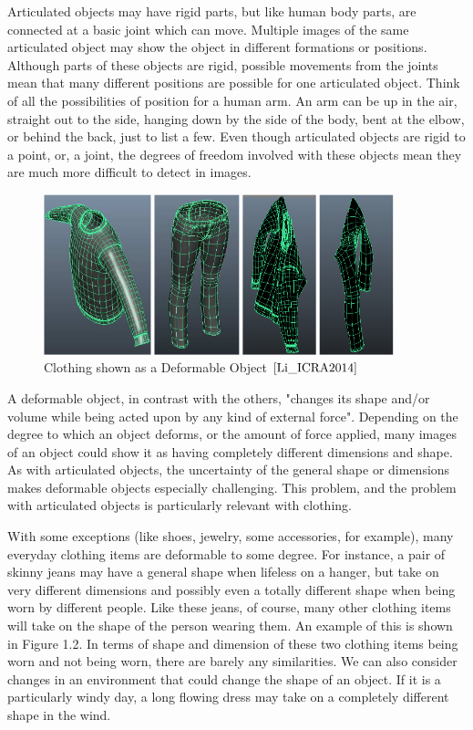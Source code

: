 \documentclass[12pt]{report} %
\begin{document}
	Articulated objects may have rigid parts, but like human body parts, are connected at a basic joint which can move\cite{szeliski2010computer}. Multiple images of the same articulated object may show the object in different formations or positions. Although parts of these objects are rigid, possible movements from the joints mean that many different positions are possible for one articulated object. Think of all the possibilities of position for a human arm. An arm can be up in the air, straight out to the side, hanging down by the side of the body, bent at the elbow, or behind the back, just to list a few. Even though articulated objects are rigid to a point, or, a joint, the degrees of freedom involved with these objects mean they are much more difficult to detect in images.
	
 \begin{figure}
\centering
\includegraphics[width=4in]{deformable} 
\caption{Clothing shown as a Deformable Object $\cite{Li_ICRA2014}$}
\end{figure}

	A deformable object, in contrast with the others, "changes its shape and/or volume while being acted upon by any kind of external force"\cite{wolfram}. Depending on the degree to which an object deforms, or the amount of force applied, many images of an object could show it as having completely different dimensions and shape. As with articulated objects, the uncertainty of the general shape or dimensions makes deformable objects especially challenging. This problem, and the problem with articulated objects is particularly relevant with clothing. 
	
	With some exceptions (like shoes, jewelry, some accessories, for example), many everyday clothing items are deformable to some degree. For instance, a pair of skinny jeans may have a general shape when lifeless on a hanger, but take on very different dimensions and possibly even a totally different shape when being worn by different people. Like these jeans, of course, many other clothing items will take on the shape of the person wearing them. An example of this is shown in Figure 1.2.\cite{Li_ICRA2014} In terms of shape and dimension of these two clothing items being worn and not being worn, there are barely any similarities. We can also consider changes in an environment that could change the shape of an object. If it is a particularly windy day, a long flowing dress may take on a completely different shape in the wind.
\end{document}
